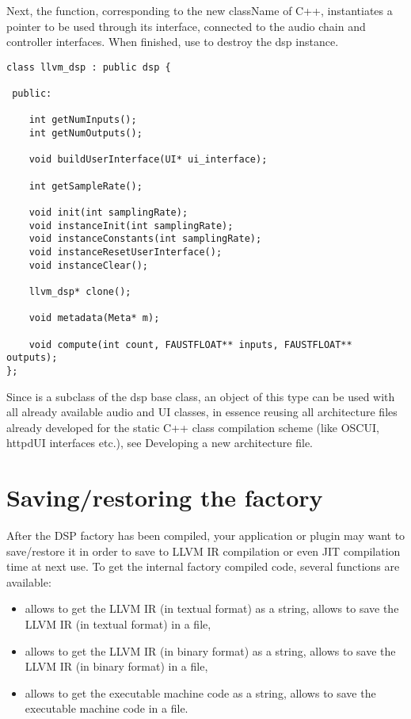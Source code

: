Next, the  function, corresponding to the new className of C++, instantiates a  pointer to be used through its interface, connected to the audio chain and controller interfaces. When finished, use  to destroy the dsp instance.

\begin{lstlisting}
class llvm_dsp : public dsp {
    
 public:
    
    int getNumInputs();    
    int getNumOutputs();
    
    void buildUserInterface(UI* ui_interface);
   
    int getSampleRate();
    
    void init(int samplingRate);  
    void instanceInit(int samplingRate);
    void instanceConstants(int samplingRate);
    void instanceResetUserInterface();  
    void instanceClear();
    
    llvm_dsp* clone();
    
    void metadata(Meta* m);
    
    void compute(int count, FAUSTFLOAT** inputs, FAUSTFLOAT** outputs);
};
\end{lstlisting}

Since  is a subclass of the dsp base class, an object of this type can be used with all already available audio and UI classes, in essence reusing all architecture files already developed for the static C++ class compilation scheme (like OSCUI, httpdUI interfaces etc.), see Developing a new architecture file.

\section{Saving/restoring the factory}

After the DSP factory has been compiled, your application or plugin may want to save/restore it in order to save \faust to LLVM IR compilation or even JIT compilation time at next use. To get the internal factory compiled code, several functions are available:

\begin{itemize}
\item  {} allows to get the LLVM IR (in textual format) as a string,  allows to save the LLVM IR (in textual format) in a file,
\item  {} allows to get the LLVM IR (in binary format) as a string,  allows to save the LLVM IR (in binary format) in a file,
\item  {} allows to get the executable machine code as a string,  allows to save the executable machine code in a file.
\end{itemize}

